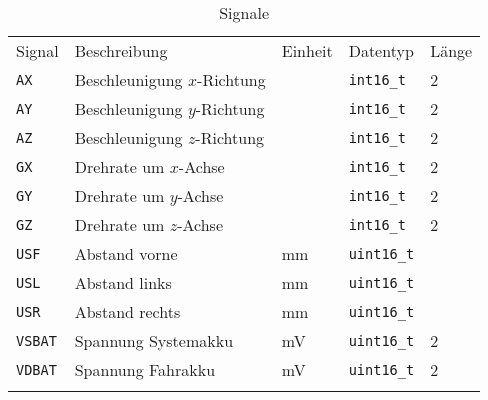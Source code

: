 \begin{table}[htbp]%
	\centering
	\caption{Signale}
	\label{tab:Comm:DAQ:Signals}
	\begin{tabular}{lllll}
		\mytoprule
		Signal & Beschreibung & Einheit & Datentyp & Länge \\
		\mymidrule
		\verb|AX| & Beschleunigung $x$-Richtung &  & \verb|int16_t| & 2 \\
		\verb|AY| & Beschleunigung $y$-Richtung &  & \verb|int16_t| & 2 \\
		\verb|AZ| & Beschleunigung $z$-Richtung &  & \verb|int16_t| & 2 \\
		\verb|GX| & Drehrate um $x$-Achse & & \verb|int16_t| & 2 \\
		\verb|GY| & Drehrate um $y$-Achse & & \verb|int16_t| & 2 \\
		\verb|GZ| & Drehrate um $z$-Achse & & \verb|int16_t| & 2 \\
		\verb|USF| & Abstand vorne & mm & \verb|uint16_t| & \\
		\verb|USL| & Abstand links & mm & \verb|uint16_t| & \\
		\verb|USR| & Abstand rechts & mm & \verb|uint16_t| & \\
		\verb|VSBAT| & Spannung Systemakku & mV & \verb|uint16_t| & 2\\
		\verb|VDBAT| & Spannung Fahrakku & mV & \verb|uint16_t| & 2\\
		\mybottomrule
	\end{tabular}
\end{table}



